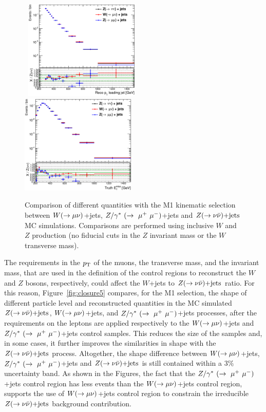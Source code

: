 \begin{figure}
\begin{center}
{}
\mbox{
  \includegraphics[width=0.49\textwidth]{Appendix_ClosureTestZnunu/Figures/compareNormalized_pt1_A6_Nom.eps}
  \includegraphics[width=0.49\textwidth]{Appendix_ClosureTestZnunu/Figures/compareNormalized_truth_met_A6_Nom.eps}
}
\end{center}
\caption[Comparison of different quantities with the M1 kinematic selection, with no fiducial cuts in the invariant or transverse mass, between $\wmn$+jets, $\zmm$+jets and $\znn$ MC simulations.]{
Comparison of different quantities with the M1 kinematic selection between $\wmn$+jets, $\zmm$+jets and $\znn$ MC simulations.
Comparisons are performed using inclusive $W$ and $Z$ production (no fiducial cuts in the $Z$ invariant mass or the $W$ transverse mass).
}
\label{fig:ClosurePlotNormalized1}
\end{figure}

The requirements in the $p_{\mathrm{T}}$ of the muons, the transverse mass, and the invariant mass, that are used in the definition of the control regions to reconstruct the $W$ and $Z$ bosons, respectively, could affect the $W$+jets to $\znn$ ratio.
For this reason, Figure~\ref{fig:closure5} compares, for the M1 selection, the shape of different particle level and reconstructed quantities in the MC simulated $\znn$, $\wmn$+jets, and $\zmm$+jets processes, after the requirements on the leptons are applied respectively to the $\wmn$+jets and $\zmm$+jets control samples.
This reduces the size of the samples and, in some cases, it further improves the similarities in shape with the $\znn$ process.
Altogether, the shape difference between $\wmn$+jets, $\zmm$+jets and $\znn$ is still contained within a $3\%$ uncertainty band.
As shown in the Figures, the fact that the $\zmm$+jets control region has less events than the $\wmn$+jets control region, supports the use of $\wmn$+jets control region to constrain the irreducible $\znn$ background contribution.


